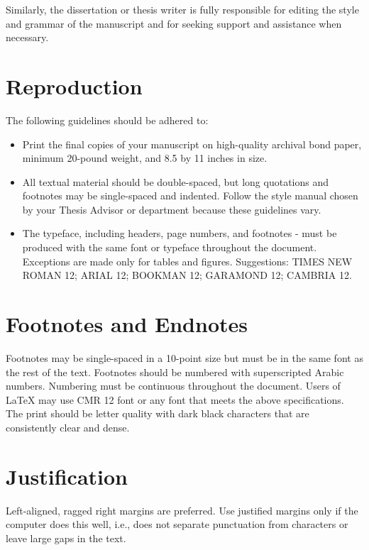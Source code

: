 Similarly, the dissertation or thesis writer is fully responsible for editing the style and grammar of the manuscript and for seeking support and assistance when necessary.

\section{Reproduction}

The following guidelines should be adhered to:

\begin{itemize}
\item	Print the final copies of your manuscript on high-quality archival bond paper, minimum 20-pound weight, and 8.5 by 11 inches in size. 
\item	All textual material should be double-spaced, but long quotations and footnotes may be single-spaced and indented. Follow the style manual chosen by your Thesis Advisor or department because these guidelines vary. 
\item	The typeface, including headers, page numbers, and footnotes - must be produced with the same font or typeface throughout the document. Exceptions are made only for tables and figures. Suggestions: TIMES NEW ROMAN 12; ARIAL 12; BOOKMAN 12; GARAMOND 12; CAMBRIA 12.

\end{itemize}

\section{Footnotes and Endnotes}

Footnotes may be single-spaced in a 10-point size but must be in the same font as the rest of the text. Footnotes should be numbered with superscripted Arabic numbers. Numbering must be continuous throughout the document. Users of LaTeX may use CMR 12 font or any font that meets the above specifications. The print should be letter quality with dark black characters that are consistently clear and dense.

\section{Justification}

Left-aligned, ragged right margins are preferred. Use justified margins only if the computer does this well, i.e., does not separate punctuation from characters or leave large gaps in the text.

